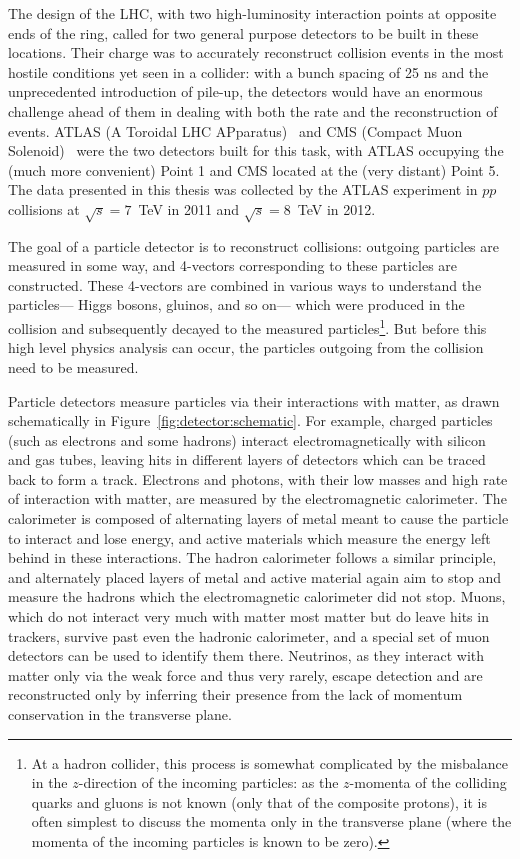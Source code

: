 \label{chapter:detector}

The design of the LHC, with two high-luminosity interaction points at opposite ends of the ring, called for two general purpose detectors to be built in these locations. Their charge was to accurately reconstruct collision events in the most hostile conditions yet seen in a collider: with a bunch spacing of 25 ns and the unprecedented introduction of pile-up, the detectors would have an enormous challenge ahead of them in dealing with both the rate and the reconstruction of events. ATLAS (A Toroidal LHC APparatus)~\cite{ATLASPaper} and CMS (Compact Muon Solenoid)~\cite{CMSPaper} were the two detectors built for this task, with ATLAS occupying the (much more convenient) Point 1 and CMS located at the (very distant) Point 5. The data presented in this thesis was collected by the ATLAS experiment in $pp$ collisions at $\sqrt{s} = 7$~TeV in 2011 and $\sqrt{s} = 8$~TeV in 2012.

The goal of a particle detector is to reconstruct collisions: outgoing particles are measured in some way, and 4-vectors corresponding to these particles are constructed. These 4-vectors are combined in various ways to understand the particles--- Higgs bosons, gluinos, and so on--- which were produced in the collision and subsequently decayed to the measured particles\footnote{At a hadron collider, this process is somewhat complicated by the misbalance in the $z$-direction of the incoming particles: as the $z$-momenta of the colliding quarks and gluons is not known (only that of the composite protons), it is often simplest to discuss the momenta only in the transverse plane (where the momenta of the incoming particles is known to be zero).}. But before this high level physics analysis can occur, the particles outgoing from the collision need to be measured.

Particle detectors measure particles via their interactions with matter, as drawn schematically in Figure~\ref{fig:detector:schematic}. For example, charged particles (such as electrons and some hadrons) interact electromagnetically with silicon and gas tubes, leaving hits in different layers of detectors which can be traced back to form a track. Electrons and photons, with their low masses and high rate of interaction with matter, are measured by the electromagnetic calorimeter. The calorimeter is composed of alternating layers of metal meant to cause the particle to interact and lose energy, and active materials which measure the energy left behind in these interactions. The hadron calorimeter follows a similar principle, and alternately placed layers of metal and active material again aim to stop and measure the hadrons which the electromagnetic calorimeter did not stop. Muons, which do not interact very much with matter most matter but do leave hits in trackers, survive past even the hadronic calorimeter, and a special set of muon detectors can be used to identify them there. Neutrinos, as they interact with matter only via the weak force and thus very rarely, escape detection and are reconstructed only by inferring their presence from the lack of momentum conservation in the transverse plane.


